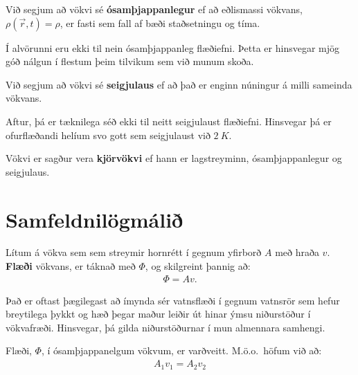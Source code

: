 \begin{tcolorbox}
\begin{definition}
Við segjum að vökvi sé \textbf{ósamþjappanlegur} ef að eðlismassi vökvans, $\rho(\Vec{r},t) = \rho$, er fasti sem fall af bæði staðsetningu og tíma.
\end{definition}
\end{tcolorbox}

Í alvörunni eru ekki til nein ósamþjappanleg flæðiefni. Þetta er hinsvegar mjög góð nálgun í flestum þeim tilvikum sem við munum skoða.

\begin{tcolorbox}
\begin{definition}
Við segjum að vökvi sé \textbf{seigjulaus} ef að það er enginn núningur á milli sameinda vökvans. 
\end{definition}
\end{tcolorbox}

Aftur, þá er tæknilega séð ekki til neitt seigjulaust flæðiefni. Hinsvegar þá er ofurflæðandi helíum svo gott sem seigjulaust við $\SI{2}{K}$.

\begin{tcolorbox}
\begin{definition}
Vökvi er sagður vera \textbf{kjörvökvi} ef hann er lagstreyminn, ósamþjappanlegur og seigjulaus.
\end{definition}
\end{tcolorbox}



\section{Samfeldnilögmálið}

\begin{tcolorbox}
\begin{definition}
Lítum á vökva sem sem streymir hornrétt í gegnum yfirborð $A$ með hraða $v$. \textbf{Flæði} vökvans, er táknað með $\Phi$, og skilgreint þannig að:
 \begin{align*}
     \Phi = Av.
 \end{align*}
\end{definition}
\end{tcolorbox}

Það er oftast þægilegast að ímynda sér vatnsflæði í gegnum vatnsrör sem hefur breytilega þykkt og hæð þegar maður leiðir út hinar ýmsu niðurstöður í vökvafræði. Hinsvegar, þá gilda niðurstöðurnar í mun almennara samhengi.

\begin{tcolorbox}
\begin{theorem}
Flæði, $\Phi$, í ósamþjappanelgum vökvum, er varðveitt. M.ö.o.~höfum við að:
\begin{align*}
    A_1 v_1 = A_2 v_2
\end{align*}
\end{theorem}
\end{tcolorbox}

